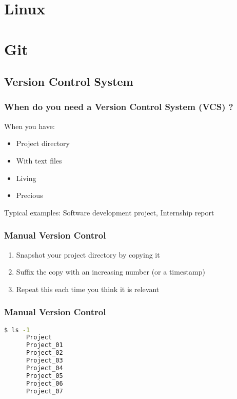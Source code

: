 



\begin{frame}
   \titlepage
\end{frame}

\begin{frame}
   \tableofcontents
\end{frame}

\section{Linux}
\section{Git}

\subsection{Version Control System}

\begin{frame}\frametitle{When do you need a Version Control System (VCS) ?}
   When you have:
   \begin{itemize}
      \item Project directory
      \item With text files
      \item Living
      \item Precious
   \end{itemize}
   \vspace{1em}
   Typical examples: Software development project, Internship report
\end{frame}

\begin{frame}\frametitle{Manual Version Control}
   \begin{enumerate}
      \item Snapshot your project directory by copying it
      \item Suffix the copy with an increasing number (or a timestamp)
      \item Repeat this each time you think it is relevant
   \end{enumerate}
\end{frame}

\begin{frame}[fragile]\frametitle{Manual Version Control}
   \begin{lstlisting}[language=bash, style=bash, autogobble]
      $ ls -1
      Project
      Project_01
      Project_02
      Project_03
      Project_04
      Project_05
      Project_06
      Project_07
   \end{lstlisting}
\end{frame}

